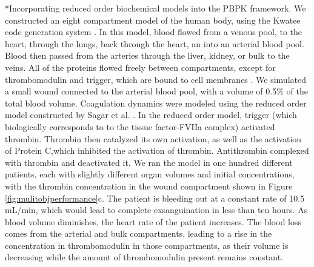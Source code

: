\documentclass[11pt]{article}
\makeatletter
\renewcommand\paragraph{\@startsection
  {paragraph}{2}{0mm}
  {-0.05in}
  {-0.5\baselineskip}
  {\normalfont\normalsize\itshape}}
\makeatother
\begin{document}
\paragraph*{Incorporating reduced order biochemical models into the PBPK framework.}
We constructed an eight compartment model of the human body, using the Kwatee code generation system \citep{varnerlab_2015_32628}.
In this model, blood flowed from a venous pool, to the heart, through the lungs, back through the heart, an into an arterial blood pool.
Blood then passed from the arteries through the liver, kidney, or bulk to the veins. All of the proteins flowed freely between compartments, except for thrombomodulin and trigger, which are bound to cell membranes \cite{esmon1989roles}. We simulated a small wound connected to the arterial blood pool, with a volume of 0.5\% of the total blood volume. Coagulation dynamics were modeled using the reduced order model constructed by Sagar et al. \cite{sagar2015dynamic}. In the reduced order model, trigger (which biologically corresponds to to the tissue factor-FVIIa complex) activated thrombin. Thrombin then catalyzed its own activation, as well as the activation of Protein C,which inhibited the activation of thrombin. Antithrombin complexed with thrombin and deactivated it. We ran the model in one hundred different patients, each with slightly different organ volumes and initial concentrations, with the thrombin concentration in the wound compartment shown in Figure \ref{fig:mulitobjperformance}c. The patient is bleeding out at a constant rate of 10.5 mL/min, which would lead to complete exsanguination in less than ten hours. As blood volume diminishes, the heart rate of the patient increases.
The blood loss comes from the arterial and bulk compartments, leading to a rise in the concentration in thrombomodulin in those compartments, as their volume is decreasing while the amount of thrombomodulin present remains constant.

\end{document}
